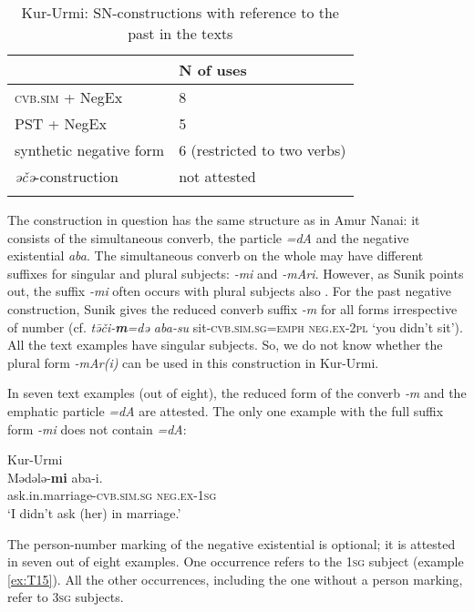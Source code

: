 \documentclass[output=paper,colorlinks,citecolor=brown]{langscibook}
\begin{document}
\begin{table}
    \caption{Kur-Urmi: SN-constructions with reference to the past in the texts \citep{sunik1958a}}
    \label{tab:T4}
    \begin{tabularx}{.8\textwidth}{Xl}
    \lsptoprule
     & N of uses \\ \midrule
    \textsc{cvb.sim} + NegEx & 8 \\
    PST + NegEx & 5 \\
    synthetic negative form & 6 (restricted to two verbs) \\
    \textit{əčə}-construction & not attested \\
    \lspbottomrule
    \end{tabularx}
    \end{table}

The construction in question has the same structure as in Amur Nanai: it consists of the simultaneous converb, the particle \textit{=dA} and the negative existential \textit{aba}. The simultaneous converb on the whole may have different suffixes for singular and plural subjects: \textit{-mi} and \textit{-mAri}. However, as Sunik points out, the suffix \textit{-mi} often occurs with plural subjects also \citep[95]{sunik1958a}. For the past negative construction, Sunik gives the reduced converb suffix \textit{-m} for all forms irrespective of number (cf. \textit{tə̄či-\textbf{m}=də aba-su} sit-\textsc{cvb.sim.sg=emph} \textsc{neg.ex-2pl} `you didn’t sit'). All the text examples have singular subjects. So, we do not know whether the plural form \textit{-mAr(i)} can be used in this construction in Kur-Urmi.

In seven text examples (out of eight), the reduced form of the converb \textit{‑m} and the emphatic particle \textit{=dA} are attested. The only one example with the full suffix form \textit{-mi} does not contain \textit{=dA}:

\ea Kur-Urmi \label{ex:T15}\\
	\gll Mədələ-\textbf{mi}	aba-i.\\
	ask.in.marriage-\textsc{cvb.sim.sg}	\textsc{neg.ex-1sg}\\
	\glt `I didn’t ask (her) in marriage.' \citep[127, text]{sunik1958a}
\z

The person-number marking of the negative existential is optional; it is attested in seven out of eight examples. One occurrence refers to the \textsc{1sg} subject (example \ref{ex:T15}). All the other occurrences, including the one without a person marking, refer to \textsc{3sg} subjects.
\end{document}
